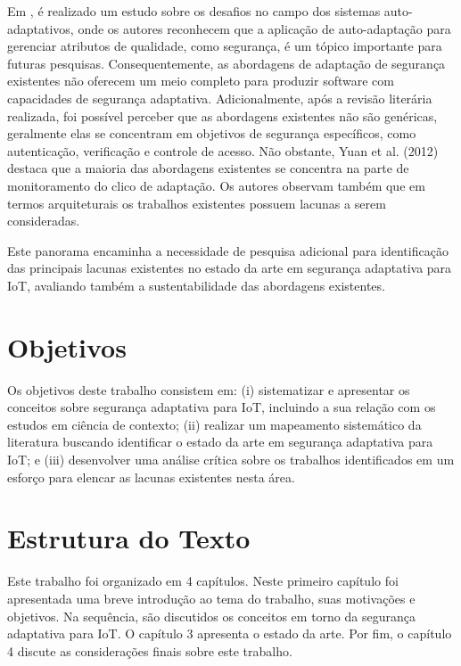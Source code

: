\documentclass[tid,table]{texufpel} %
\begin{document}
Em \cite{weyns12}, é realizado um estudo sobre os desafios no campo dos sistemas auto-adaptativos, onde os autores reconhecem que a aplicação de auto-adaptação para gerenciar atributos de qualidade, como segurança, é um tópico importante para futuras pesquisas. Consequentemente, as abordagens de adaptação de segurança existentes não oferecem um meio completo para produzir software com capacidades de segurança adaptativa. Adicionalmente, após a revisão literária realizada, foi possível perceber que as abordagens existentes não são genéricas, geralmente elas se concentram em objetivos de segurança específicos, como autenticação, verificação e controle de acesso. Não obstante, Yuan et al. (2012)\nocite{yuan12} destaca que a maioria das abordagens existentes se concentra na parte de monitoramento do clico de adaptação. Os autores observam também que em termos arquiteturais os trabalhos existentes possuem lacunas a serem consideradas. 

Este panorama encaminha a necessidade de pesquisa adicional para identificação das principais lacunas existentes no estado da arte em segurança adaptativa para IoT, avaliando também a sustentabilidade das abordagens existentes.

\section{Objetivos}

Os objetivos deste trabalho consistem em: (i) sistematizar e apresentar os conceitos sobre segurança adaptativa para IoT, incluindo a sua relação com os estudos em ciência de contexto; (ii) realizar um mapeamento sistemático da literatura buscando identificar o estado da arte em segurança adaptativa para IoT; e (iii) desenvolver uma análise crítica sobre os trabalhos identificados em um esforço para elencar as lacunas existentes nesta área.


\section{Estrutura do Texto}

Este trabalho foi organizado em 4 capítulos. Neste primeiro capítulo foi apresentada uma breve introdução ao tema do trabalho, suas motivações e objetivos. Na sequência, são discutidos os conceitos em torno da segurança adaptativa para IoT. O capítulo 3 apresenta o estado da arte. Por fim, o capítulo 4 discute as considerações finais sobre este trabalho.
\end{document}
